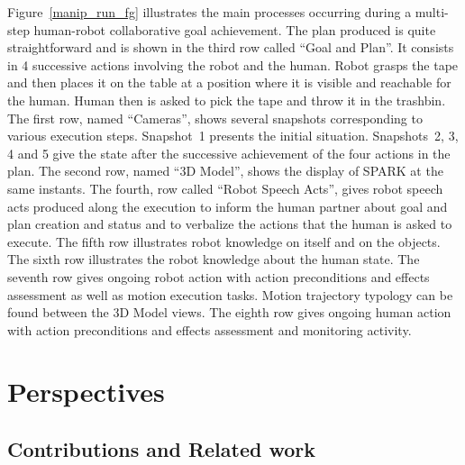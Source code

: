 \documentclass[preprint,12pt]{elsarticle}
\begin{document}
Figure~\ref{manip_run_fg} illustrates the main processes occurring
during a multi-step human-robot collaborative goal achievement.  The
plan produced is quite straightforward and is shown in the third row
called ``Goal and Plan''. It consists in 4 successive actions
involving the robot and the human. Robot grasps the tape and then
places it on the table at a position where it is visible and reachable
for the human. Human then is asked to pick the tape and throw it in
the trashbin. The first row, named ``Cameras'', shows several
snapshots corresponding to various execution steps. Snapshot~1
presents the initial situation. Snapshots~2, 3, 4 and 5 give the state
after the successive achievement of the four actions in the plan. The
second row, named ``3D Model'', shows the display of SPARK at the same
instants. The fourth, row called ``Robot Speech Acts'', gives robot
speech acts produced along the execution to inform the human partner
about goal and plan creation and status and to verbalize the actions
that the human is asked to execute. The fifth row illustrates robot
knowledge on itself and on the objects. The sixth row illustrates the
robot knowledge about the human state. The seventh row gives ongoing
robot action with action preconditions and effects assessment as well
as motion execution tasks. Motion trajectory typology can be found
between the 3D Model views. The eighth row gives ongoing human action
with action preconditions and effects assessment and monitoring
activity.



\section{Perspectives}
\label{sect|conclusion}

\subsection{Contributions and Related work}\label{sec:soa}
\end{document}
